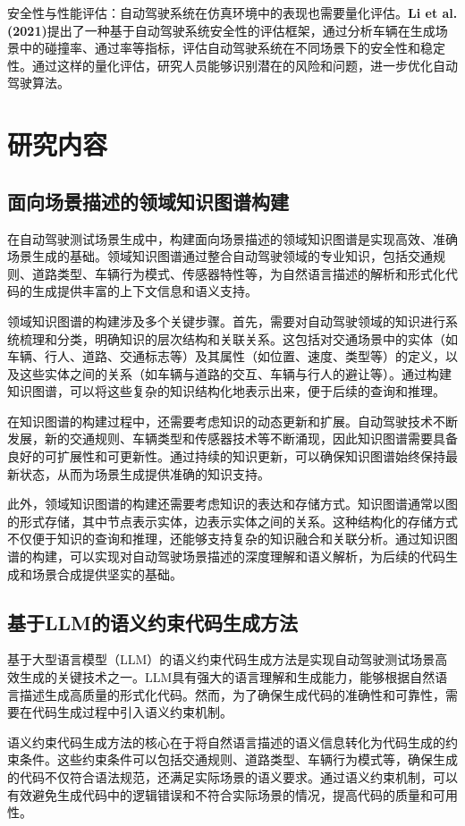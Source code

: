 	安全性与性能评估：自动驾驶系统在仿真环境中的表现也需要量化评估。\textbf{Li et al. (2021)}提出了一种基于自动驾驶系统安全性的评估框架，通过分析车辆在生成场景中的碰撞率、通过率等指标，评估自动驾驶系统在不同场景下的安全性和稳定性。通过这样的量化评估，研究人员能够识别潜在的风险和问题，进一步优化自动驾驶算法。
	
	\section{研究内容}
	\subsection{面向场景描述的领域知识图谱构建}
	在自动驾驶测试场景生成中，构建面向场景描述的领域知识图谱是实现高效、准确场景生成的基础。领域知识图谱通过整合自动驾驶领域的专业知识，包括交通规则、道路类型、车辆行为模式、传感器特性等，为自然语言描述的解析和形式化代码的生成提供丰富的上下文信息和语义支持。
	
	领域知识图谱的构建涉及多个关键步骤。首先，需要对自动驾驶领域的知识进行系统梳理和分类，明确知识的层次结构和关联关系。这包括对交通场景中的实体（如车辆、行人、道路、交通标志等）及其属性（如位置、速度、类型等）的定义，以及这些实体之间的关系（如车辆与道路的交互、车辆与行人的避让等）。通过构建知识图谱，可以将这些复杂的知识结构化地表示出来，便于后续的查询和推理。
	
	在知识图谱的构建过程中，还需要考虑知识的动态更新和扩展。自动驾驶技术不断发展，新的交通规则、车辆类型和传感器技术等不断涌现，因此知识图谱需要具备良好的可扩展性和可更新性。通过持续的知识更新，可以确保知识图谱始终保持最新状态，从而为场景生成提供准确的知识支持。
	
	此外，领域知识图谱的构建还需要考虑知识的表达和存储方式。知识图谱通常以图的形式存储，其中节点表示实体，边表示实体之间的关系。这种结构化的存储方式不仅便于知识的查询和推理，还能够支持复杂的知识融合和关联分析。通过知识图谱的构建，可以实现对自动驾驶场景描述的深度理解和语义解析，为后续的代码生成和场景合成提供坚实的基础。
	
	\subsection{基于LLM的语义约束代码生成方法}
	基于大型语言模型（LLM）的语义约束代码生成方法是实现自动驾驶测试场景高效生成的关键技术之一。LLM具有强大的语言理解和生成能力，能够根据自然语言描述生成高质量的形式化代码。然而，为了确保生成代码的准确性和可靠性，需要在代码生成过程中引入语义约束机制。
	
	语义约束代码生成方法的核心在于将自然语言描述的语义信息转化为代码生成的约束条件。这些约束条件可以包括交通规则、道路类型、车辆行为模式等，确保生成的代码不仅符合语法规范，还满足实际场景的语义要求。通过语义约束机制，可以有效避免生成代码中的逻辑错误和不符合实际场景的情况，提高代码的质量和可用性。
	
